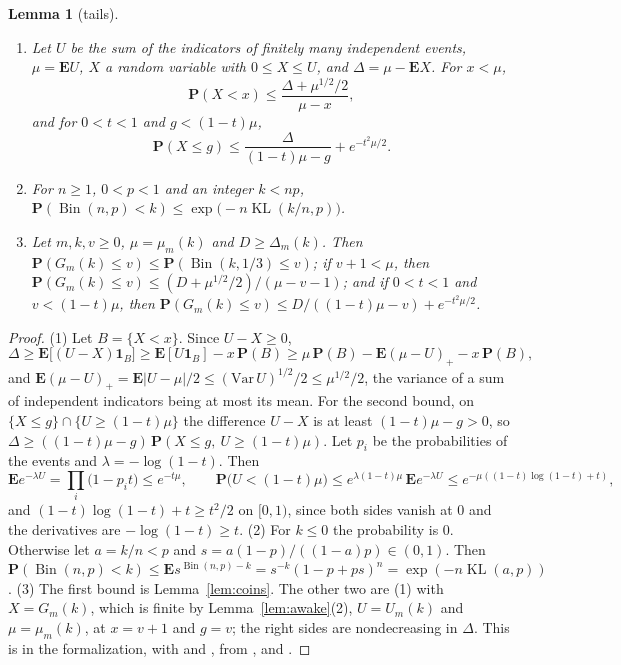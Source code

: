 \documentclass[11pt]{amsart}
\newtheorem{lemma}[theorem]{Lemma}
\theoremstyle{definition}
\numberwithin{equation}{section}
\newcommand{\lean}[1]{\ignorespaces}
\newcommand{\E}{\mathbf{E}}
\renewcommand{\P}{\mathbf{P}}
\newcommand{\one}{\mathbf{1}}
\newcommand{\Bin}{\operatorname{Bin}}
\newcommand{\KL}{\operatorname{KL}}
\begin{document}
\begin{lemma}[tails]\label{lem:tails}\lean{FrogModel.D3.Assembly.lemma12_G_proof, FrogModel.D3.Assembly.lemma12'_G_proof, FrogModel.D3.Assembly.cdfG_le_binCdf_proof, FrogModel.D3.Iface.lemma12_G, FrogModel.D3.Iface.lemma12_general_proof, FrogModel.D3.Iface.lemma12'_general_proof, FrogModel.D3.Iface.chernoff_binLt_proof, FrogModel.D3.Iface.lemma12_general, FrogModel.D3.Iface.lemma12'_general, FrogModel.D3.Iface.chernoff_binLt, FrogModel.D3.Iface.lemma12'_G, FrogModel.D3.Iface.cdfG_le_binCdf}
\begin{enumerate}
\item Let $U$ be the sum of the indicators of finitely many independent events, $\mu=\E U$, $X$ a random variable with $0\le X\le U$, and $\Delta=\mu-\E X$. For $x<\mu$,
\[
\P(X<x)\le\frac{\Delta+\mu^{1/2}/2}{\mu-x},
\]
and for $0<t<1$ and $g<(1-t)\mu$,
\[
\P(X\le g)\le\frac{\Delta}{(1-t)\mu-g}+e^{-t^2\mu/2}.
\]
\item For $n\ge1$, $0<p<1$ and an integer $k<np$, $\P(\Bin(n,p)<k)\le\exp\bigl(-n\KL(k/n,p)\bigr)$.
\item Let $m,k,v\ge0$, $\mu=\mu_m(k)$ and $D\ge\Delta_m(k)$. Then $\P(G_m(k)\le v)\le\P(\Bin(k,1/3)\le v)$; if $v+1<\mu$, then $\P(G_m(k)\le v)\le(D+\mu^{1/2}/2)/(\mu-v-1)$; and if $0<t<1$ and $v<(1-t)\mu$, then $\P(G_m(k)\le v)\le D/((1-t)\mu-v)+e^{-t^2\mu/2}$.
\end{enumerate}
\end{lemma}

\begin{proof}
(1) Let $B=\{X<x\}$. Since $U-X\ge0$,
\[
\Delta\ge\E\bigl[(U-X)\one_B\bigr]\ge\E[U\one_B]-x\,\P(B)\ge\mu\,\P(B)-\E(\mu-U)_+-x\,\P(B),
\]
and $\E(\mu-U)_+=\E|U-\mu|/2\le(\mathrm{Var}\,U)^{1/2}/2\le\mu^{1/2}/2$, the variance of a sum of independent indicators being at most its mean. For the second bound, on $\{X\le g\}\cap\{U\ge(1-t)\mu\}$ the difference $U-X$ is at least $(1-t)\mu-g>0$, so $\Delta\ge((1-t)\mu-g)\,\P(X\le g,\ U\ge(1-t)\mu)$. Let $p_i$ be the probabilities of the events and $\lambda=-\log(1-t)$. Then
\[
\E e^{-\lambda U}=\prod_i\bigl(1-p_it\bigr)\le e^{-t\mu},\qquad\P\bigl(U<(1-t)\mu\bigr)\le e^{\lambda(1-t)\mu}\,\E e^{-\lambda U}\le e^{-\mu((1-t)\log(1-t)+t)}, %
\]
and $(1-t)\log(1-t)+t\ge t^2/2$ on $[0,1)$, since both sides vanish at $0$ and the derivatives are $-\log(1-t)\ge t$. (2) For $k\le0$ the probability is $0$. Otherwise let $a=k/n<p$ and $s=a(1-p)/((1-a)p)\in(0,1)$. Then $\P(\Bin(n,p)<k)\le\E s^{\Bin(n,p)-k}=s^{-k}(1-p+ps)^n=\exp(-n\KL(a,p))$. (3) The first bound is Lemma~\ref{lem:coins}. The other two are (1) with $X=G_m(k)$, which is finite by Lemma~\ref{lem:awake}(2), $U=U_m(k)$ and $\mu=\mu_m(k)$, at $x=v+1$ and $g=v$; the right sides are nondecreasing in $\Delta$. This is  in the formalization, with  and , from ,  and .
\end{proof}
\end{document}
